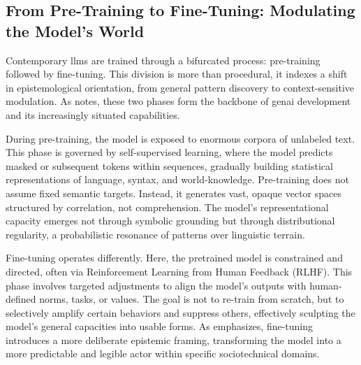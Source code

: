 %
%

\subsection{From Pre-Training to Fine-Tuning: Modulating the Model's
	World}\label{finetuning}

Contemporary \glspl{llm} are trained through a bifurcated process: pre-training followed by fine-tuning. This division is more than procedural, it indexes a shift in epistemological orientation, from general pattern discovery to context-sensitive modulation. As \textcite[964]{dishon2024} notes, these two phases form the backbone of \gls{genai} development and its increasingly situated capabilities.

During pre-training, the model is exposed to enormous corpora of unlabeled text. This phase is governed by self-supervised learning, where the model predicts masked or subsequent tokens within sequences, gradually building statistical representations of language, syntax, and world-knowledge. Pre-training does not assume fixed semantic targets. Instead, it generates vast, opaque vector spaces structured by correlation, not comprehension. The model's representational capacity emerges not through symbolic grounding but through distributional regularity, a probabilistic resonance of patterns over linguistic terrain.

Fine-tuning operates differently. Here, the pretrained model is constrained and directed, often via Reinforcement Learning from Human Feedback (RLHF). This phase involves targeted adjustments to align the model's outputs with human-defined norms, tasks, or values. The goal is not to re-train from scratch, but to selectively amplify certain behaviors and suppress others, effectively sculpting the model’s general capacities into usable forms. As \textcite[964]{dishon2024} emphasizes, fine-tuning introduces a more deliberate epistemic framing, transforming the model into a more predictable and legible actor within specific sociotechnical domains.

